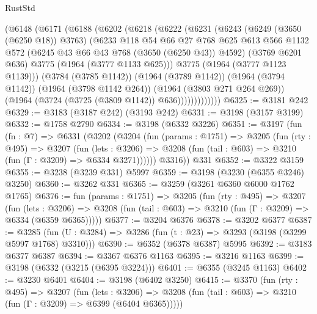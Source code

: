 \begin{lexlean}{RustStd}
\begin{coremodule}
            (@6148
              (@6171
                (@6188
                  (@6202
                    (@6218
                      (@6222
                        (@6231
                          (@6243
                            (@6249 (@3650 (@6250 @18)) @3763)
                            (@6233
                              @118
                              @54
                              @66
                              @27
                              @768
                              @625
                              @613
                              @566
                              @1132
                              @572
                              (@6245 @43 @66 @43 @768 (@3650 (@6250 @43)) @4592)
                              (@3769 @6201 @636)
                              @3775
                              (@1964 (@3777 @1133 @625)))
                            @3775
                            (@1964 (@3777 @1123 @1139)))
                          (@3784 (@3785 @1142))
                          (@1964 (@3789 @1142))
                          (@1964 (@3794 @1142))
                          (@1964 (@3798 @1142 @264))
                          (@1964 (@3803 @271 @264 @269))
                          (@1964 (@3724 (@3725 (@3809 @1142)) @636)))))))))))))
@6325 := @3181 @242
@6329 := @3183 (@3187 @242) (@3193 @242)
@6331 := @3198 (@3157 @3199)
@6332 := @1758 @2790
@6334 := @3198 (@6332 @3226)
@6351 := @3197
    (fun (fn : @7) =>
    @6331
      (@3202
        (@3204
          (fun (params : @1751) =>
          @3205
            (fun (rty : @495) =>
            @3207
              (fun (lets : @3206) =>
              @3208 (fun (tail : @603) => @3210 (fun (Γ : @3209) => @6334 @3271))))))
        @3316))
    @331
@6352 := @3322 @3159
@6355 := @3238 (@3239 @331) @5997
@6359 := @3198 (@3230 (@6355 @3246) @3250)
@6360 := @3262 @331
@6365 := @3259 (@3261 @6360 @6000 @1762 @1765)
@6376 := fun (params : @1751) =>
  @3205
    (fun (rty : @495) =>
    @3207
      (fun (lets : @3206) =>
      @3208 (fun (tail : @603) => @3210 (fun (Γ : @3209) => @6334 (@6359 @6365)))))
@6377 := @3204 @6376
@6378 := @3202 @6377
@6387 := @3285 (fun (U : @3284) => @3286 (fun (t : @23) => @3293 (@3198 (@3299 @5997 @1768) @3310)))
@6390 := @6352 (@6378 @6387) @5995
@6392 := @3183 @6377 @6387
@6394 := @3367 @6376 @1163
@6395 := @3216 @1163
@6399 := @3198 (@6332 (@3215 (@6395 @3224)))
@6401 := @6355 (@3245 @1163)
@6402 := @3230 @6401
@6404 := @3198 (@6402 @3250)
@6415 := @3370
    (fun (rty : @495) =>
    @3207
      (fun (lets : @3206) =>
      @3208 (fun (tail : @603) => @3210 (fun (Γ : @3209) => @6399 (@6404 @6365)))))

\end{coremodule}
\end{lexlean}
